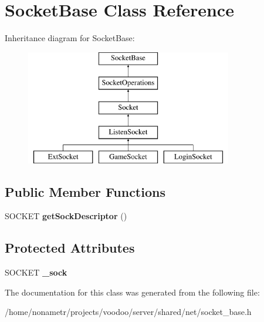 \hypertarget{classSocketBase}{\section{\-Socket\-Base \-Class \-Reference}
\label{classSocketBase}
}
\-Inheritance diagram for \-Socket\-Base\-:\begin{figure}[H]
\begin{center}
\leavevmode
\includegraphics[height=5.000000cm]{classSocketBase}
\end{center}
\end{figure}
\subsection*{\-Public \-Member \-Functions}
\begin{DoxyCompactItemize}
\item 
\hypertarget{classSocketBase_ab32e06f32c8762d4261b98793fabcf06}{\-S\-O\-C\-K\-E\-T {\bfseries get\-Sock\-Descriptor} ()}\label{classSocketBase_ab32e06f32c8762d4261b98793fabcf06}

\end{DoxyCompactItemize}
\subsection*{\-Protected \-Attributes}
\begin{DoxyCompactItemize}
\item 
\hypertarget{classSocketBase_a07179135c511d69e46cb29fcb1c2b8af}{\-S\-O\-C\-K\-E\-T {\bfseries \-\_\-sock}}\label{classSocketBase_a07179135c511d69e46cb29fcb1c2b8af}

\end{DoxyCompactItemize}


\-The documentation for this class was generated from the following file\-:\begin{DoxyCompactItemize}
\item 
/home/nonametr/projects/voodoo/server/shared/net/socket\-\_\-base.\-h\end{DoxyCompactItemize}
